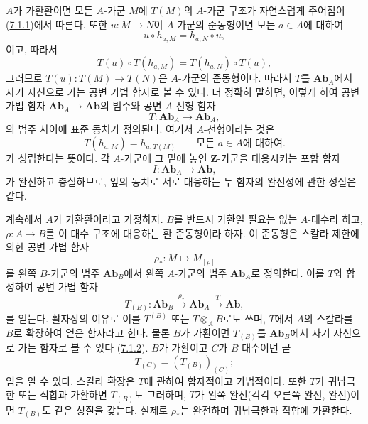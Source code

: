 \begin{env}[7.1.2]
\label{III.7.1.2-fr}
$A$가 가환환이면 모든 $A$-가군 $M$에 $T(M)$의 $A$-가군 구조가
자연스럽게 주어짐이 (\hyperref[III.7.1.1-fr]{7.1.1})에서 따른다.
또한 $u:M\to N$이 $A$-가군의 준동형이면 모든 $a\in A$에 대하여
\[
  u\circ h_{a,M}=h_{a,N}\circ u,
\]
이고, 따라서
\[
  T(u)\circ T(h_{a,M})
  =
  T(h_{a,N})\circ T(u),
\]
그러므로 $T(u):T(M)\to T(N)$은 $A$-가군의 준동형이다. 따라서
$T$를 $\mathbf{Ab}_A$에서 자기 자신으로 가는 공변 가법 함자로 볼
수 있다. 더 정확히 말하면, 이렇게 하여 공변 가법 함자
$\mathbf{Ab}_A\to\mathbf{Ab}$의 범주와 공변 $A$-선형 함자
\[
  T:\mathbf{Ab}_A\longrightarrow\mathbf{Ab}_A,
\]
의 범주 사이에 표준 동치가 정의된다. 여기서 $A$-선형이라는 것은
\[
  T(h_{a,M})=h_{a,T(M)}
  \qquad\text{모든 }a\in A\text{에 대하여}.
\]
가 성립한다는 뜻이다. 각 $A$-가군에 그 밑에 놓인 $\mathbf Z$-가군을
대응시키는 포함 함자
\[
  I:\mathbf{Ab}_A\longrightarrow\mathbf{Ab},
\]
가 완전하고 충실하므로, 앞의 동치로 서로 대응하는 두 함자의
완전성에 관한 성질은 같다.
\end{env}

\begin{env}[7.1.3]
\label{III.7.1.3-fr}
계속해서 $A$가 가환환이라고 가정하자. $B$를 반드시 가환일 필요는
없는 $A$-대수라 하고, $\rho:A\to B$를 이 대수 구조에 대응하는 환
준동형이라 하자. 이 준동형은 스칼라 제한에 의한 공변
가법 함자
\[
  \rho_*:M\longmapsto M_{[\rho]}
\]
를 왼쪽 $B$-가군의 범주 $\mathbf{Ab}_B$에서 왼쪽 $A$-가군의 범주
$\mathbf{Ab}_A$로 정의한다. 이를 $T$와 합성하여 공변 가법 함자
\[
  T_{(B)}:
  \mathbf{Ab}_B
  \xrightarrow{\rho_*}
  \mathbf{Ab}_A
  \xrightarrow{T}
  \mathbf{Ab},
\]
를 얻는다. 활자상의 이유로 이를 $T^{(B)}$ 또는 $T\otimes_A B$로도
쓰며, $T$에서 $A$의 스칼라를 $B$로 확장하여 얻은 함자라고 한다.
물론 $B$가 가환이면 $T_{(B)}$를 $\mathbf{Ab}_B$에서 자기 자신으로
가는 함자로 볼 수 있다
(\hyperref[III.7.1.2-fr]{7.1.2}). $B$가 가환이고 $C$가
$B$-대수이면 곧
\[
  T_{(C)}=(T_{(B)})_{(C)};
\]
임을 알 수 있다. 스칼라 확장은 $T$에 관하여 함자적이고 가법적이다.
또한 $T$가 귀납극한 또는 직합과 가환하면 $T_{(B)}$도 그러하며,
$T$가 왼쪽 완전(각각 오른쪽 완전, 완전)이면 $T_{(B)}$도 같은
성질을 갖는다. 실제로 $\rho_*$는 완전하며 귀납극한과 직합에
가환한다.
\end{env}

